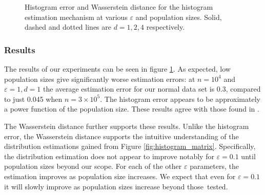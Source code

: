 \documentclass[a4paper,12pt]{article}
\renewcommand{\epsilon}{\varepsilon}
\begin{document}
\begin{figure}
{    }
    \caption{Histogram error and Wasserstein distance for the histogram estimation mechanism at various $\epsilon$ and population sizes. Solid, dashed and dotted lines are $d=1,2,4$ respectively.}
    \label{fig:histogram_errors}
\end{figure}

\subsubsection{Results}

\enlargethispage{\baselineskip}

The results of our experiments can be seen in figure \ref{fig:histogram_errors}. As expected, low population sizes give significantly worse estimation errors: at $n=10^4$ and $\epsilon=1,d=1$ the average estimation error for our normal data set is 0.3, compared to just 0.045 when $n=3\times10^5$. The histogram error appears to be approximately a power function of the population size. These results agree with those found in \cite{microsoft_telemetry}.

The Wasserstein distance further supports these results. Unlike the histogram error, the Wasserstein distance supports the intuitive understanding of the distribution estimations gained from Figure \ref{fig:histogram_matrix}. Specifically, the distribution estimation does not appear to improve notably for $\epsilon=0.1$ until population sizes beyond our scope. For each of the other $\epsilon$ parameters, the estimation improves as population size increases. We expect that even for $\epsilon=0.1$ it will slowly improve as population sizes increase beyond those~tested. 
\end{document}
